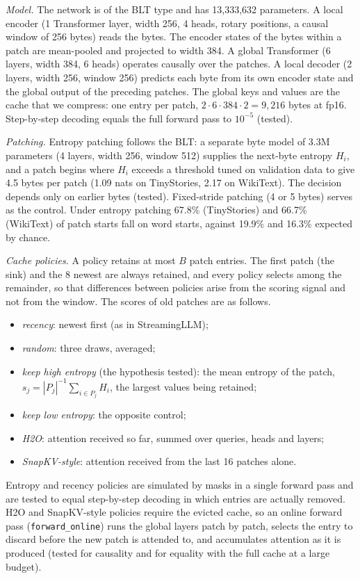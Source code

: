 \documentclass[10pt,twocolumn]{extarticle}
\begin{document}
\textit{Model.} The network is of the BLT type and has 13,333,632 parameters. A local encoder (1 Transformer layer, width 256, 4 heads, rotary positions, a causal window of 256 bytes) reads the bytes. The encoder states of the bytes within a patch are mean-pooled and projected to width 384. A global Transformer (6 layers, width 384, 6 heads) operates causally over the patches. A local decoder (2 layers, width 256, window 256) predicts each byte from its own encoder state and the global output of the preceding patches. The global keys and values are the cache that we compress: one entry per patch, $2\cdot 6\cdot 384\cdot 2 = 9{,}216$ bytes at fp16. Step-by-step decoding equals the full forward pass to $10^{-5}$ (tested).

\textit{Patching.} Entropy patching follows the BLT: a separate byte model of 3.3M parameters (4 layers, width 256, window 512) supplies the next-byte entropy $H_i$, and a patch begins where $H_i$ exceeds a threshold tuned on validation data to give 4.5 bytes per patch (1.09 nats on TinyStories, 2.17 on WikiText). The decision depends only on earlier bytes (tested). Fixed-stride patching (4 or 5 bytes) serves as the control. Under entropy patching 67.8\% (TinyStories) and 66.7\% (WikiText) of patch starts fall on word starts, against 19.9\% and 16.3\% expected by chance.

\textit{Cache policies.} A policy retains at most $B$ patch entries. The first patch (the sink) and the 8 newest are always retained, and every policy selects among the remainder, so that differences between policies arise from the scoring signal and not from the window. The scores of old patches are as follows.
\begin{itemize}
\item \emph{recency}: newest first (as in StreamingLLM);
\item \emph{random}: three draws, averaged;
\item \emph{keep high entropy} (the hypothesis tested): the mean entropy of the patch, $s_j = |P_j|^{-1}\sum_{i\in P_j} H_i$, the largest values being retained;
\item \emph{keep low entropy}: the opposite control;
\item \emph{H2O}: attention received so far, summed over queries, heads and layers;
\item \emph{SnapKV-style}: attention received from the last 16 patches alone.
\end{itemize}
Entropy and recency policies are simulated by masks in a single forward pass and are tested to equal step-by-step decoding in which entries are actually removed. H2O and SnapKV-style policies require the evicted cache, so an online forward pass (\texttt{forward\_online}) runs the global layers patch by patch, selects the entry to discard before the new patch is attended to, and accumulates attention as it is produced (tested for causality and for equality with the full cache at a large budget).
\end{document}
